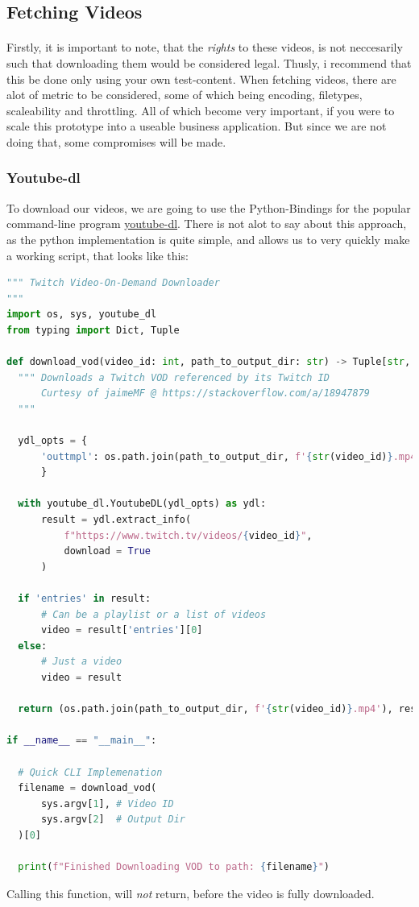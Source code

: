 \documentclass{article}
\begin{document}
\subsection{Fetching Videos}
\paragraph{}
Firstly, it is important to note, that the \textit{rights} to these videos, is not neccesarily
such that downloading them would be considered legal. Thusly, i recommend that this be done only
using your own test-content.
\newline\newline
When fetching videos, there are alot of metric to be considered, some of which being
encoding, filetypes, scaleability and throttling.
All of which become very important, if you were to scale this prototype into a useable
business application. But since we are not doing that, some compromises will be made.


\subsubsection{Youtube-dl}

To download our videos, we are going to use the Python-Bindings for the popular command-line program
\href{https://ytdl-org.github.io/youtube-dl/index.html}{youtube-dl}. There is not alot to say
about this approach, as the python implementation is quite simple, and allows us to very
quickly make a working script, that looks like this:

\begin{lstlisting}[language=Python]
""" Twitch Video-On-Demand Downloader
"""
import os, sys, youtube_dl
from typing import Dict, Tuple

def download_vod(video_id: int, path_to_output_dir: str) -> Tuple[str, Dict]:
  """ Downloads a Twitch VOD referenced by its Twitch ID
      Curtesy of jaimeMF @ https://stackoverflow.com/a/18947879  
  """
  
  ydl_opts = {
      'outtmpl': os.path.join(path_to_output_dir, f'{str(video_id)}.mp4')
      }

  with youtube_dl.YoutubeDL(ydl_opts) as ydl:
      result = ydl.extract_info(
          f"https://www.twitch.tv/videos/{video_id}",
          download = True
      )

  if 'entries' in result:
      # Can be a playlist or a list of videos
      video = result['entries'][0]
  else:
      # Just a video
      video = result
      
  return (os.path.join(path_to_output_dir, f'{str(video_id)}.mp4'), result)

if __name__ == "__main__":

  # Quick CLI Implemenation
  filename = download_vod(
      sys.argv[1], # Video ID
      sys.argv[2]  # Output Dir
  )[0]

  print(f"Finished Downloading VOD to path: {filename}")
\end{lstlisting}
Calling this function, will \textit{not} return, before the video is fully downloaded.
\end{document}
